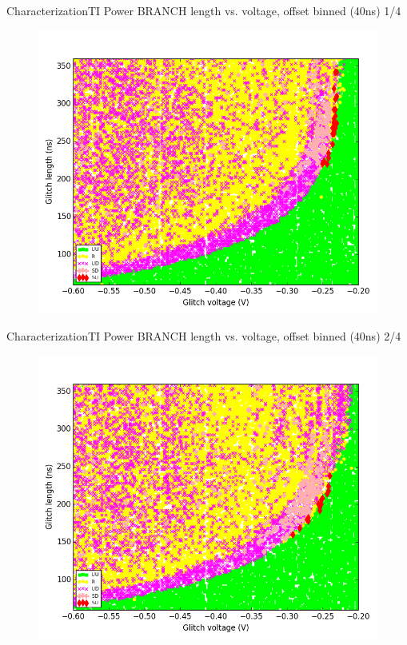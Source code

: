 \documentclass[table]{beamer}
\begin{document}
\begin{frame}{Characterization}{TI Power BRANCH length vs. voltage, offset binned (40ns) 1/4}
    \vspace{-.3cm}
    \begin{figure}[H]
      \centering
      \includegraphics[width=.75\textwidth]{../../plots/newplots/ti-auth-voltage-length-offets-1.png}
    \end{figure}
\end{frame}
\begin{frame}{Characterization}{TI Power BRANCH length vs. voltage, offset binned (40ns) 2/4}
    \vspace{-.3cm}
    \begin{figure}[H]
      \centering
      \includegraphics[width=.75\textwidth]{../../plots/newplots/ti-auth-voltage-length-offets-2.png}
    \end{figure}
\end{frame}
\end{document}

